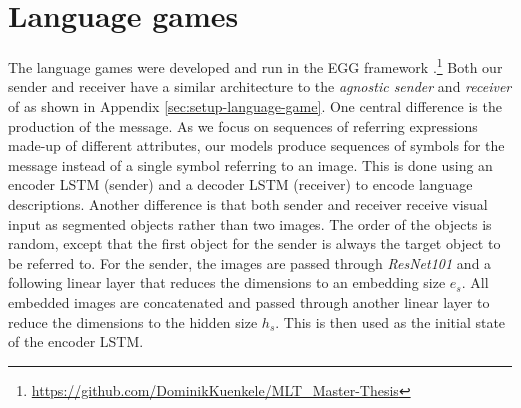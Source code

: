 \documentclass[11pt]{article}
\begin{document}
\section{Language games}
The language games were developed and run in the EGG framework \citep{Kharitonov2019}.\footnote{\href{https://github.com/DominikKuenkele/MLT\_Master-Thesis}{https://github.com/DominikKuenkele/MLT\_Master-Thesis}}
Both our sender and receiver have a similar architecture to the \emph{agnostic sender} and \emph{receiver} of \citep{Lazaridou2016} as shown in Appendix \ref*{sec:setup-language-game}.
One central difference is the production of the message.
As we focus on sequences of referring expressions made-up of different attributes, our models produce sequences of symbols for the message %
instead of a single symbol referring to an image. %
This is done using an encoder LSTM (sender) and a decoder LSTM (receiver) to encode language descriptions.
%
%
%
Another difference is that both sender and receiver receive visual input as segmented objects rather than two images.
The order of the objects is random, except that the first object for the sender is always the target object to be referred to.
For the sender, the images are passed through \emph{ResNet101} \citep{He2016} and a following linear layer that reduces the dimensions to an embedding size $e_s$.
All embedded images are concatenated and passed through another linear layer to reduce the dimensions to the hidden size $h_s$.
This is then used as the initial state of the encoder LSTM.
\end{document}
